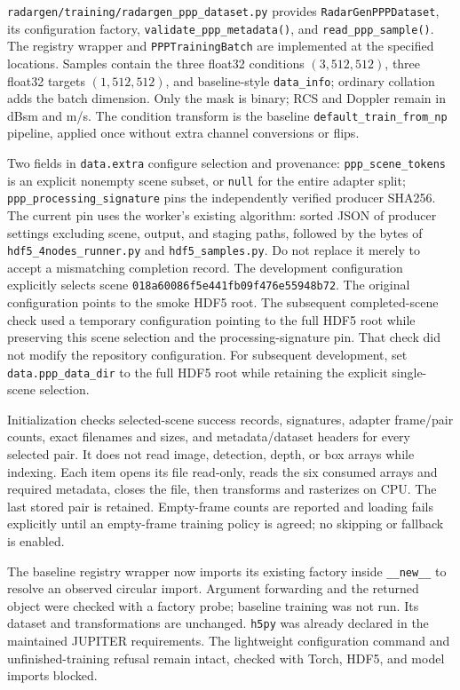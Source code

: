 \documentclass[11pt,a4paper]{article}
\begin{document}
\texttt{radargen/training/radargen\_ppp\_dataset.py} provides
\texttt{RadarGenPPPDataset}, its configuration factory,
\texttt{validate\_ppp\_metadata()}, and \texttt{read\_ppp\_sample()}.
The registry wrapper and \texttt{PPPTrainingBatch} are implemented at the
specified locations. Samples contain the three float32 conditions
\((3,512,512)\), three float32 targets \((1,512,512)\), and baseline-style
\texttt{data\_info}; ordinary collation adds the batch dimension.
Only the mask is binary; RCS and Doppler remain in dBsm and m/s.
The condition transform is the baseline \texttt{default\_train\_from\_np}
pipeline, applied once without extra channel conversions or flips.

Two fields in \texttt{data.extra} configure selection and provenance:
\texttt{ppp\_scene\_tokens} is an explicit nonempty scene subset, or
\texttt{null} for the entire adapter split;
\texttt{ppp\_processing\_signature} pins the independently verified producer
SHA256. The current pin uses the worker's existing algorithm: sorted JSON
of producer settings excluding scene, output, and staging paths, followed
by the bytes of \texttt{hdf5\_4nodes\_runner.py} and
\texttt{hdf5\_samples.py}. Do not replace it merely to accept a mismatching
completion record. The development configuration explicitly selects scene
\texttt{018a60086f5e441fb09f476e55948b72}.
The original configuration points to the smoke HDF5 root.
The subsequent completed-scene check used a temporary configuration
pointing to the full HDF5 root while preserving this scene selection
and the processing-signature pin.
That check did not modify the repository configuration.
For subsequent development, set \texttt{data.ppp\_data\_dir} to the
full HDF5 root while retaining the explicit single-scene selection.

Initialization checks selected-scene success records, signatures, adapter
frame/pair counts, exact filenames and sizes, and metadata/dataset headers
for every selected pair. It does not read image, detection, depth, or box
arrays while indexing. Each item opens its file read-only, reads the six
consumed arrays and required metadata, closes the file, then transforms and
rasterizes on CPU. The last stored pair is retained. Empty-frame counts
are reported and loading fails explicitly until an empty-frame training
policy is agreed; no skipping or fallback is enabled.

The baseline registry wrapper now imports its existing factory inside
\texttt{\_\_new\_\_} to resolve an observed circular import. Argument
forwarding and the returned object were checked with a factory probe;
baseline training was not run. Its dataset and transformations are unchanged.
\texttt{h5py} was already declared in the maintained JUPITER requirements.
The lightweight configuration command and unfinished-training refusal
remain intact, checked with Torch, HDF5, and model imports blocked.
\end{document}
